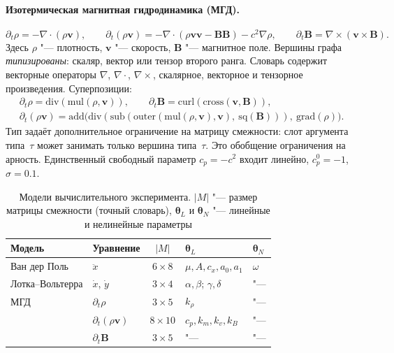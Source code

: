 \documentclass[12pt]{article}
\newcommand{\tht}{\bm{\theta}}
\begin{document}
\paragraph{Изотермическая магнитная гидродинамика (МГД).}
\[
\partial_t\rho=-\nabla\!\cdot(\rho\mathbf v),\qquad
\partial_t(\rho\mathbf v)=-\nabla\!\cdot(\rho\mathbf v\mathbf v-\mathbf B\mathbf B)-c^2\nabla\rho,\qquad
\partial_t\mathbf B=\nabla\times(\mathbf v\times\mathbf B).
\]
Здесь $\rho$ "--- плотность, $\mathbf v$ "--- скорость, $\mathbf B$ "--- магнитное поле. Вершины графа \emph{типизированы}: скаляр, вектор или тензор второго ранга. Словарь содержит векторные операторы $\nabla$, $\nabla\cdot$, $\nabla\times$, скалярное, векторное и тензорное произведения. Суперпозиции:
\begin{gather*}
\partial_t\rho=\mathrm{div}(\mathrm{mul}(\rho,\mathbf v)),\qquad
\partial_t\mathbf B=\mathrm{curl}(\mathrm{cross}(\mathbf v,\mathbf B)),\\
\partial_t(\rho\mathbf v)=\mathrm{add}\bigl(\mathrm{div}(\mathrm{sub}(\mathrm{outer}(\mathrm{mul}(\rho,\mathbf v),\mathbf v),\ \mathrm{sq}(\mathbf B))),\ \mathrm{grad}(\rho)\bigr).
\end{gather*}
Тип задаёт дополнительное ограничение на матрицу смежности: слот аргумента типа~$\tau$ может занимать только вершина типа~$\tau$. Это обобщение ограничения на арность. Единственный свободный параметр $c_p=-c^2$ входит линейно, $c_p^0=-1$, $\sigma=0.1$.

\begin{table}[!ht]
\centering
\caption{Модели вычислительного эксперимента. $|M|$ "--- размер матрицы смежности (точный словарь), $\tht_L$ и $\tht_N$ "--- линейные и нелинейные параметры}
\label{tab:models}
\begin{tabular}{llcll}
\toprule
Модель & Уравнение & $|M|$ & $\tht_L$ & $\tht_N$\\
\midrule
Ван дер Поль & $\ddot x$ & $6\times8$ & $\mu, A, c_x, a_0, a_1$ & $\omega$\\
Лотка--Вольтерра & $\dot x$, $\dot y$ & $3\times4$ & $\alpha,\beta$; $\gamma,\delta$ & "---\\
МГД & $\partial_t\rho$ & $3\times5$ & $k_\rho$ & "---\\
    & $\partial_t(\rho\mathbf v)$ & $8\times10$ & $c_p, k_m, k_v, k_B$ & "---\\
    & $\partial_t\mathbf B$ & $3\times5$ & "--- & "---\\
\bottomrule
\end{tabular}
\end{table}
\end{document}

